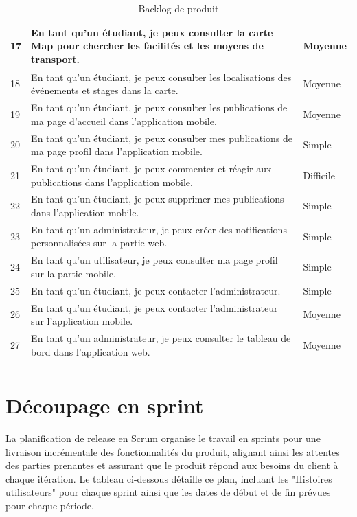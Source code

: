 \begin{sloppypar}
\begin{longtable}{|p{1.5cm}|p{11cm}|p{2cm}|}
\hline
17 & En tant qu’un étudiant, je peux consulter la carte Map pour chercher les facilités et les moyens de transport. & Moyenne \\
\hline
18 & En tant qu’un étudiant, je peux consulter les localisations des événements et stages dans la carte. & Moyenne \\
\hline
19 & En tant qu’un étudiant, je peux consulter les publications de ma page d’accueil dans l’application mobile. & Moyenne \\
\hline
20 & En tant qu’un étudiant, je peux consulter mes publications de ma page profil dans l’application mobile. & Simple \\
\hline
21 & En tant qu’un étudiant, je peux commenter et réagir aux publications dans l’application mobile. & Difficile \\
\hline
22 & En tant qu’un étudiant, je peux supprimer mes publications dans l’application mobile. & Simple \\
\hline
23 & En tant qu’un administrateur, je peux créer des notifications personnalisées sur la partie web. & Simple \\
\hline
24 & En tant qu’un utilisateur, je peux consulter ma page profil sur la partie mobile. & Simple \\
\hline
25 & En tant qu’un étudiant, je peux contacter l’administrateur. & Simple \\
\hline
26 & En tant qu’un étudiant, je peux contacter l’administrateur sur l'application mobile. & Moyenne \\
\hline
27 & En tant qu’un administrateur, je peux consulter le tableau de bord dans l’application web. & Moyenne \\
\hline
\caption{Backlog de produit}
\end{longtable}

\vspace{-1.8cm}
\section{Découpage en sprint  }
\vspace{-5mm}
La planification de release en Scrum organise le travail en sprints pour une livraison incrémentale des fonctionnalités du produit, alignant ainsi les attentes des parties prenantes et assurant que le produit répond aux besoins du client à chaque itération. Le tableau ci-dessous détaille ce plan, incluant les "Histoires utilisateurs" pour chaque sprint ainsi que les dates de début et de fin prévues pour chaque période.\\
\\


\end{sloppypar}

